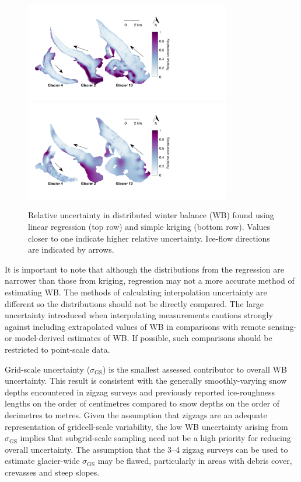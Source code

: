 \documentclass{sfuthesis}
\begin{document}
\begin{figure}[H]
	\centering
	\includegraphics[width =0.8\textwidth]{SpatialVar_LR.pdf}\\
	\includegraphics[width =0.8\textwidth]{SpatialVar_SK.pdf}\\
	\caption[Relative uncertainty in distributed winter balance (WB) found using linear regression and simple kriging]{Relative uncertainty in distributed winter balance (WB) found using linear regression (top row) and simple kriging (bottom row). Values closer to one indicate higher relative uncertainty. Ice-flow directions are indicated by arrows.}
	\label{fig:WSMBspatialvar}
\end{figure}


It is important to note that although the distributions from the regression are narrower than those from kriging, regression may not a more accurate method of estimating WB. The methods of calculating interpolation uncertainty are different so the distributions should not be directly compared. The large uncertainty introduced when interpolating measurements cautions strongly against including extrapolated values of WB in comparisons with remote sensing- or model-derived estimates of WB. If possible, such comparisons should be restricted to point-scale data.

Grid-scale uncertainty ($\sigma_{\mathrm{GS}}$) is the smallest assessed contributor to overall WB uncertainty. This result is consistent with the generally smoothly-varying snow depths encountered in zigzag surveys and previously reported ice-roughness lengths on the order of centimetres \citep[e.g.][]{Hock2005} compared to snow depths on the order of decimetres to metres. Given the assumption that zigzags are an adequate representation of gridcell-scale variability, the low WB uncertainty arising from $\sigma_{\mathrm{GS}}$ implies that subgrid-scale sampling need not be a high priority for reducing overall uncertainty. The assumption that the 3--4 zigzag surveys can be used to estimate glacier-wide $\sigma_{\mathrm{GS}}$ may be flawed, particularly in areas with debris cover, crevasses and steep slopes.
\end{document}
